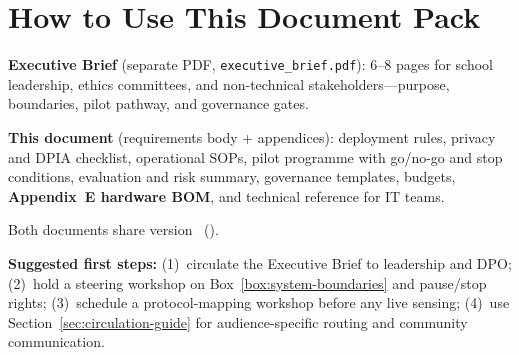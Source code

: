 \section{How to Use This Document Pack}
\label{sec:how-to-use}

\textbf{Executive Brief} (separate PDF, \texttt{executive\_brief.pdf}): 6--8 pages for school leadership,
ethics committees, and non-technical stakeholders---purpose, boundaries, pilot pathway, and
governance gates.

\textbf{This document} (requirements body + appendices): deployment rules, privacy and DPIA checklist,
operational SOPs, pilot programme with go/no-go and stop conditions, evaluation and risk summary,
governance templates, budgets, \textbf{Appendix~E hardware BOM}, and technical reference for IT teams.

Both documents share version \docversion\ (\docid).

\textbf{Suggested first steps:} (1)~circulate the Executive Brief to leadership and DPO;
(2)~hold a steering workshop on Box~\ref{box:system-boundaries} and pause/stop rights;
(3)~schedule a protocol-mapping workshop before any live sensing;
(4)~use Section~\ref{sec:circulation-guide} for audience-specific routing and community communication.


